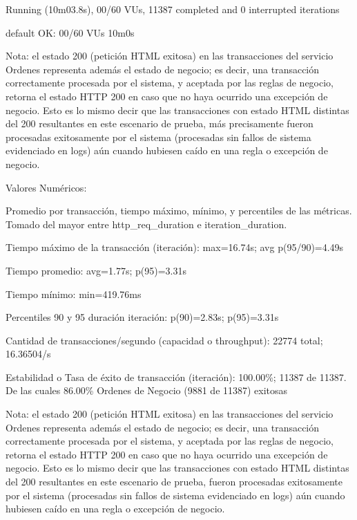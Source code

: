 \documentclass[
  paper=a4,
  ,captions=tableheading
]{scrartcl}
\renewenvironment{quote}{\begin{customblockquote}\list{}{\rightmargin=0em\leftmargin=0em}%
\item\relax\color{blockquote-text}\ignorespaces}{\unskip\unskip\endlist\end{customblockquote}}
\begin{document}
\begin{quote}
Running (10m03.8s), 00/60 VUs, 11387 completed and 0 interrupted
iterations

default OK: 00/60 VUs 10m0s
\end{quote}

Nota: el estado 200 (petición HTML exitosa) en las transacciones del
servicio Ordenes representa además el estado de negocio; es decir, una
transacción correctamente procesada por el sistema, y aceptada por las
reglas de negocio, retorna el estado HTTP 200 en caso que no haya
ocurrido una excepción de negocio. Esto es lo mismo decir que las
transacciones con estado HTML distintas del 200 resultantes en este
escenario de prueba, más precisamente fueron procesadas exitosamente por
el sistema (procesadas sin fallos de sistema evidenciado en logs) aún
cuando hubiesen caído en una regla o excepción de negocio.

Valores Numéricos:

Promedio por transacción, tiempo máximo, mínimo, y percentiles de las
métricas. Tomado del mayor entre http\_req\_duration e
iteration\_duration.

\begin{quote}
Tiempo máximo de la transacción (iteración): max=16.74s; avg
p(95/90)=4.49s

Tiempo promedio: avg=1.77s; p(95)=3.31s

Tiempo mínimo: min=419.76ms

Percentiles 90 y 95 duración iteración: p(90)=2.83s; p(95)=3.31s

Cantidad de transacciones/segundo (capacidad o throughput): 22774 total;
16.36504/s

Estabilidad o Tasa de éxito de transacción (iteración): 100.00\%; 11387
de 11387. De las cuales 86.00\% Ordenes de Negocio (9881 de 11387)
exitosas
\end{quote}

Nota: el estado 200 (petición HTML exitosa) en las transacciones del
servicio Ordenes representa además el estado de negocio; es decir, una
transacción correctamente procesada por el sistema, y aceptada por las
reglas de negocio, retorna el estado HTTP 200 en caso que no haya
ocurrido una excepción de negocio. Esto es lo mismo decir que las
transacciones con estado HTML distintas del 200 resultantes en este
escenario de prueba, fueron procesadas exitosamente por el sistema
(procesadas sin fallos de sistema evidenciado en logs) aún cuando
hubiesen caído en una regla o excepción de negocio.
\end{document}
